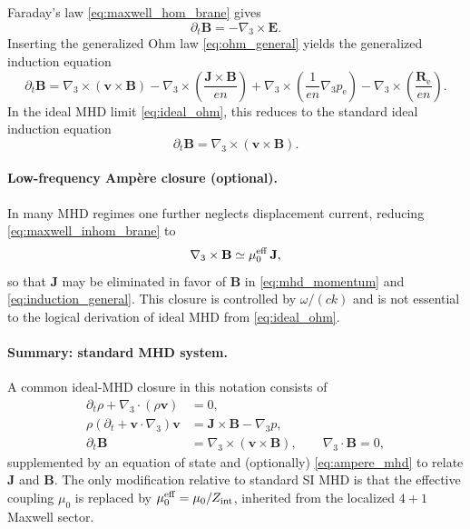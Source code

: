 \documentclass[11pt]{article}
\newcommand{\gradthree}{\nabla_3}
\newcommand{\ele}{\mathrm{e}}
\newcommand{\E}{\mathbf{E}}
\newcommand{\B}{\mathbf{B}}
\newcommand{\Jb}{\mathbf{J}}
\newcommand{\rhob}{\rho}
\newcommand{\muzeff}{\mu_0^{\rm eff}}
\newcommand{\Zint}{Z_{\rm int}}
\begin{document}
Faraday's law \eqref{eq:maxwell_hom_brane} gives
\begin{equation}
\partial_t \B = -\gradthree\times \E.
\label{eq:faraday_again}
\end{equation}
Inserting the generalized Ohm law \eqref{eq:ohm_general} yields the generalized induction equation
\begin{equation}
\partial_t \B
=
\gradthree\times(\mathbf{v}\times\B)
-\gradthree\times\!\left(\frac{\Jb\times\B}{e n}\right)
+\gradthree\times\!\left(\frac{1}{e n}\gradthree p_\ele\right)
-\gradthree\times\!\left(\frac{\mathbf{R}_\ele}{e n}\right).
\label{eq:induction_general}
\end{equation}
In the ideal MHD limit \eqref{eq:ideal_ohm}, this reduces to the standard ideal induction equation
\begin{equation}
\partial_t \B = \gradthree\times(\mathbf{v}\times\B).
\label{eq:induction_ideal}
\end{equation}

\paragraph{Low-frequency Amp\`ere closure (optional).}
In many MHD regimes one further neglects displacement current, reducing
\eqref{eq:maxwell_inhom_brane} to
\begin{equation}
\gradthree\times\B \simeq \muzeff\,\Jb,
\label{eq:ampere_mhd}
\end{equation}
so that \(\Jb\) may be eliminated in favor of \(\B\) in \eqref{eq:mhd_momentum} and
\eqref{eq:induction_general}. This closure is controlled by \(\omega/(ck)\) and is
not essential to the logical derivation of ideal MHD from \eqref{eq:ideal_ohm}.

\paragraph{Summary: standard MHD system.}
A common ideal-MHD closure in this notation consists of
\begin{align}
\partial_t \rhob + \gradthree\cdot(\rhob \mathbf{v}) &= 0,
\label{eq:mhd_continuity}
\\
\rhob\left(\partial_t + \mathbf{v}\cdot\gradthree\right)\mathbf{v} &= \Jb\times\B - \gradthree p,
\label{eq:mhd_mom_again}
\\
\partial_t \B &= \gradthree\times(\mathbf{v}\times\B),
\qquad
\gradthree\cdot\B=0,
\label{eq:mhd_induction_again}
\end{align}
supplemented by an equation of state and (optionally) \eqref{eq:ampere_mhd} to relate
\(\Jb\) and \(\B\). The only modification relative to standard SI MHD is that the
effective coupling \(\mu_0\) is replaced by \(\muzeff=\mu_0/\Zint\), inherited from the
localized \(4+1\) Maxwell sector.
\end{document}
